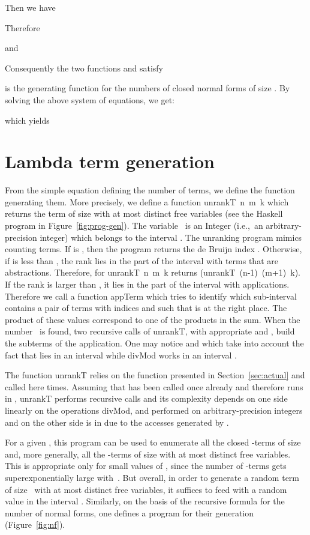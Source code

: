\documentclass{jfp1}
\newcommand{\ie}{i.e.,~}
\begin{document}
Then we have

Therefore

and

Consequently the two functions  and  satisfy 

 is the generating function for the numbers of closed normal forms of size
.
By solving the above system of equations, we get:

which yields


\section{Lambda term generation}
\label{sec:lambda-term-gener}

From the simple equation defining the number  of terms, we define the
function generating them.  More precisely, we define a function \textsf{unrankT~n~m~k}
which returns the  term of size  with at most  distinct free variables
(see the \textsf{Haskell} program in Figure~\ref{fig:prog-gen}).  The variable ~is
an \textsf{Integer} (\ie an arbitrary-precision integer) which belongs to the interval .  The unranking program mimics counting terms. If  is , then the
program returns the de Bruijn index .  Otherwise, if  is less than
, the rank  lies in the part of the interval  with
terms that are abstractions. Therefore, for  \textsf{unrankT~n~m~k}
returns \textsf{(unrankT~(n-1)~(m+1)~k)}. If the rank  is larger than
, it lies in the part of the interval  with
applications.  Therefore we call a function \textsf{appTerm} which tries to identify which
sub-interval contains a pair of terms with indices  and  such that 
is at the right place. The product of these values correspond to one of the products
 in the sum.  When the number~ is found, two recursive calls of
\textsf{unrankT}, with appropriate  and , build the subterms of the application.  One
may notice  and  which take into account the fact that  lies in an
interval  while \textsf{divMod} works in an interval
.

The function \textsf{unrankT} relies on the function  presented in
Section~\ref{sec:actual} and called here  times.  Assuming that  has been
called once already and therefore runs in , \textsf{unrankT} performs 
recursive calls and its complexity depends on one side linearly on the operations
\textsf{divMod},  and  performed on arbitrary-precision integers and on the other side is in
 due to the accesses generated by .

For a given , this program can be used to enumerate all the closed -terms of size  and, more
generally, all the -terms of size  with at most  distinct free variables.
This is appropriate only for small values of , since the number of -terms gets superexponentially 
large with~.  But overall, in order to generate a random term of size~ with at most 
distinct free variables, it suffices to feed  with a random value  in the
interval .  Similarly, on the basis of the recursive formula for the
number of normal forms, one defines a program for their generation (Figure~\ref{fig:nf}).
\end{document}
